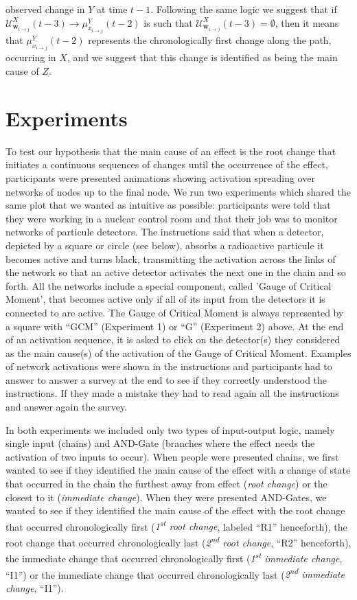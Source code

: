\documentclass[10pt,letterpaper]{article}
\begin{document}
observed change in $Y$ at time $t-1$. Following the same logic we suggest that if $\mathcal{U}^X_{\bm{w}_{i\rightarrow j}}(t-3)\rightarrow \mu^{Y}_{x_{i\rightarrow j}}(t-2)$ is such that $\mathcal{U}^X_{\bm{w}_{i\rightarrow j}}(t-3)=\emptyset$, then it means that $\mu^{Y}_{x_{i\rightarrow j}}(t-2)$ represents the chronologically first change along the path, occurring in $X$, and we suggest that this change is identified as being the main cause of $Z$.

\section{Experiments}

To test our hypothesis that the main cause of an effect is the root change that initiates a continuous sequences of changes until the occurrence of the effect, participants were presented animations showing activation spreading over networks of nodes up to the final node. We run two experiments which shared the same plot that we wanted as intuitive as possible: participants were told that they were working in a nuclear control room and that their job was to monitor networks of particule detectors. The instructions said that when a detector, depicted by a square or circle (see below), absorbs a radioactive particule it becomes active and turns black, transmitting the activation across the links of the network so that an active detector activates the next one in the chain and so forth. All the networks include a special component, called 'Gauge of Critical Moment', that becomes active only if all of its input from the detectors it is connected to are active. The Gauge of Critical Moment is always represented by a square with ``GCM'' (Experiment 1) or ``G'' (Experiment 2) above. At the end of an activation sequence, it is asked to click on the detector(s) they considered as the main cause(s) of the activation of the Gauge of Critical Moment. Examples of network activations were shown in the instructions and participants had to answer to answer a survey at the end to see if they correctly understood the instructions. If they made a mistake they had to read again all the instructions and answer again the survey. 

In both experiments we included only two types of input-output logic, namely single input (chains) and AND-Gate (branches where the effect needs the activation of two inputs to occur). When people were presented chains, we first wanted to see if they identified the main cause of the effect with a change of state that occurred in the chain the furthest away from effect (\textit{root change}) or the closest to it (\textit{immediate change}). When they were presented AND-Gates, we wanted to see if they identified the main cause of the effect with the root change that occurred chronologically first (\textit{1\textsuperscript{st} root change}, labeled ``R1'' henceforth), the root change that occurred chronologically last (\textit{2\textsuperscript{nd} root change}, ``R2'' henceforth), the immediate change that occurred chronologically first (\textit{1\textsuperscript{st} immediate change}, ``I1'') or the immediate change that occurred chronologically last (\textit{2\textsuperscript{nd} immediate change}, ``I1'').
\end{document}
